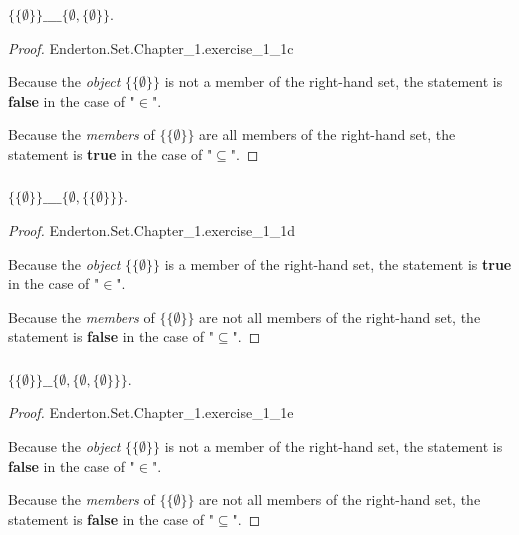 \documentclass{report}
\begin{document}
\subsubsection{}%

$\{\{\emptyset\}\} \_\_\_\_ \{\emptyset, \{\emptyset\}\}$.

\begin{proof}

    {Enderton.Set.Chapter\_1.exercise\_1\_1c}

  Because the \textit{object} $\{\{\emptyset\}\}$ is not a member of the
    right-hand set, the statement is \textbf{false} in the case of "$\in$".

  Because the \textit{members} of $\{\{\emptyset\}\}$ are all members of the
    right-hand set, the statement is \textbf{true} in the case of "$\subseteq$".

\end{proof}

\subsubsection{}%

$\{\{\emptyset\}\} \_\_\_\_ \{\emptyset, \{\{\emptyset\}\}\}$.

\begin{proof}

    {Enderton.Set.Chapter\_1.exercise\_1\_1d}

  Because the \textit{object} $\{\{\emptyset\}\}$ is a member of the right-hand
    set, the statement is \textbf{true} in the case of "$\in$".

  Because the \textit{members} of $\{\{\emptyset\}\}$ are not all members of the
    right-hand set, the statement is \textbf{false} in the case of
    "$\subseteq$".

\end{proof}

\subsubsection{}%

$\{\{\emptyset\}\} \_\_ \{\emptyset, \{\emptyset, \{\emptyset\}\}\}$.

\begin{proof}

    {Enderton.Set.Chapter\_1.exercise\_1\_1e}

  Because the \textit{object} $\{\{\emptyset\}\}$ is not a member of the
    right-hand set, the statement is \textbf{false} in the case of "$\in$".

  Because the \textit{members} of $\{\{\emptyset\}\}$ are not all members of the
    right-hand set, the statement is \textbf{false} in the case of
    "$\subseteq$".

\end{proof}
\end{document}
